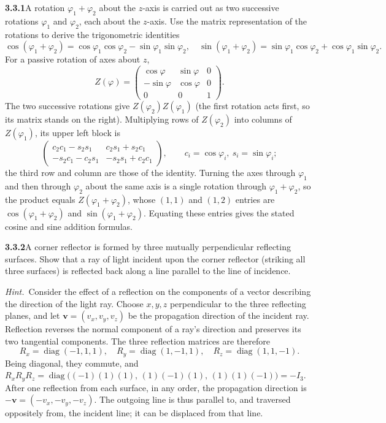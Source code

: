 \par\bigskip
\noindent\textbf{3.3.1}\quad A rotation $\varphi_{1}+\varphi_{2}$ about the
$z$-axis is carried out as two successive rotations $\varphi_{1}$ and
$\varphi_{2}$, each about the $z$-axis. Use the matrix representation of the
rotations to derive the trigonometric identities
\[
\cos(\varphi_{1}+\varphi_{2})
=\cos\varphi_{1}\cos\varphi_{2}-\sin\varphi_{1}\sin\varphi_{2},\quad
\sin(\varphi_{1}+\varphi_{2})
=\sin\varphi_{1}\cos\varphi_{2}+\cos\varphi_{1}\sin\varphi_{2}.
\]
\solution
For a passive rotation of axes about $z$,
\[
Z(\varphi)=\begin{pmatrix}
\cos\varphi&\sin\varphi&0\\-\sin\varphi&\cos\varphi&0\\0&0&1
\end{pmatrix}.
\]
The two successive rotations give $Z(\varphi_2)Z(\varphi_1)$ (the first
rotation acts first, so its matrix stands on the right).
Multiplying rows of $Z(\varphi_2)$ into columns of $Z(\varphi_1)$, its
upper left block is
\[
\begin{pmatrix}
c_2c_1-s_2s_1&c_2s_1+s_2c_1\\
-s_2c_1-c_2s_1&-s_2s_1+c_2c_1
\end{pmatrix},
\qquad c_i=\cos\varphi_i,\ s_i=\sin\varphi_i;
\]
the third row and column are those of the identity.
Turning the axes through $\varphi_1$ and then through $\varphi_2$ about
the same axis is a single rotation through $\varphi_1+\varphi_2$, so the
product equals $Z(\varphi_1+\varphi_2)$, whose $(1,1)$ and $(1,2)$
entries are $\cos(\varphi_1+\varphi_2)$ and $\sin(\varphi_1+\varphi_2)$.
Equating these entries gives the stated cosine and sine addition
formulas.

\par\bigskip
\noindent\textbf{3.3.2}\quad A corner reflector is formed by three mutually
perpendicular reflecting surfaces. Show that a ray of light incident upon the
corner reflector (striking all three surfaces) is reflected back along a line
parallel to the line of incidence.

\emph{Hint.}~Consider the effect of a reflection on the components of a vector
describing the direction of the light ray.
\solution
Choose $x,y,z$ perpendicular to the three reflecting planes, and let
$\mathbf v=(v_x,v_y,v_z)$ be the propagation direction of the incident
ray.
Reflection reverses the normal component of a ray's direction and
preserves its two tangential components. The three reflection matrices
are therefore
\[
R_x=\operatorname{diag}(-1,1,1),\quad
R_y=\operatorname{diag}(1,-1,1),\quad
R_z=\operatorname{diag}(1,1,-1).
\]
Being diagonal, they commute, and
$R_xR_yR_z=\operatorname{diag}\bigl((-1)(1)(1),\,(1)(-1)(1),\,
(1)(1)(-1)\bigr)=-I_3$. After one reflection from each surface, in any
order, the propagation direction is
$-\mathbf v=(-v_x,-v_y,-v_z)$.
The outgoing line is thus parallel to, and traversed oppositely from,
the incident line; it can be displaced from that line.

